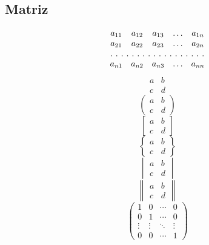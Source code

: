\documentclass{article}
\theoremstyle{mytheoremstyle}
\theoremstyle{mytheoremstyle}
\theoremstyle{myproblemstyle}
\begin{document}
    \subsection{Matriz}
    \[
    \begin{matrix}
        a_{11} & a_{12} & a_{13} & \ldots & a_{1n} \\
        a_{21} & a_{22} & a_{23} & \ldots & a_{2n} \\
        \hdotsfor[2]{5} \\
        a_{n1} & a_{n2} & a_{n3} & \ldots & a_{nn}
    \end{matrix}
    \]
    \begin{equation}
        \begin{matrix}
            a & b \\
            c & d
        \end{matrix}
    \end{equation}
    \begin{equation}
        \begin{pmatrix}
            a & b \\
            c & d
        \end{pmatrix}
    \end{equation}
    \begin{equation}
        \begin{bmatrix}
            a & b \\
            c & d
        \end{bmatrix}
    \end{equation}
    \begin{equation}
        \begin{Bmatrix}
            a & b \\
            c & d
        \end{Bmatrix}
    \end{equation}
    \begin{equation}
        \begin{vmatrix}
            a & b \\
            c & d
        \end{vmatrix}
    \end{equation}
    \begin{equation}
        \begin{Vmatrix}
            a & b \\
            c & d
        \end{Vmatrix}
    \end{equation}
    \begin{equation}
        \begin{pmatrix}
            1 & 0 & \cdots & 0 \\
            0 & 1 & \cdots & 0 \\
            \vdots & \vdots & \ddots & \vdots \\
            0 & 0 & \cdots & 1
        \end{pmatrix}
    \end{equation}
    
\end{document}
